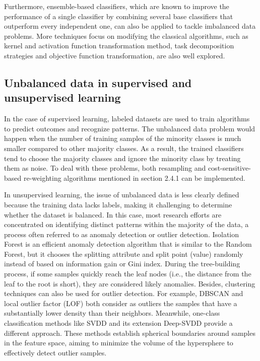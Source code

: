 Furthermore, ensemble-based classifiers, which are known to improve the performance of a single classifier by combining several base classifiers that outperform every independent one\cite{lane2012developing, krawczyk2013improved}, can also be applied to tackle imbalanced data problems. More techniques focus on modifying the classical algorithms, such as kernel and activation function transformation method\cite{raj2016towards, wu2016mixed}, task decomposition strategies\cite{xiao2016imbalanced} and objective function transformation, are also well explored. 

\subsection{Unbalanced data in supervised and unsupervised learning}
\label{subsec-lr-unbalance-super-unsuper}
In the case of supervised learning, labeled datasets are used to train algorithms to predict outcomes and recognize patterns. The unbalanced data problem would happen when the number of training samples of the minority classes is much smaller compared to other majority classes. As a result, the trained classifiers tend to choose the majority classes and ignore the minority class by treating them as noise\cite{lu1998robust, articleM}. To deal with these problems, both resampling and cost-sensitive-based re-weighting algorithms mentioned in section 2.4.1 can be implemented. 

In unsupervised learning, the issue of unbalanced data is less clearly defined because the training data lacks labels, making it challenging to determine whether the dataset is balanced. In this case, most research efforts are concentrated on identifying distinct patterns within the majority of the data, a process often referred to as anomaly detection or outlier detection\cite{chandola2009anomaly}. Isolation Forest is an efficient anomaly detection algorithm that is similar to the Random Forest, but it chooses the splitting attribute and split point (value) randomly instead of based on information gain or Gini index. During the tree-building process, if some samples quickly reach the leaf nodes (i.e., the distance from the leaf to the root is short), they are considered likely anomalies\cite{liu2008isolation}. Besides, clustering techniques can also be used for outlier detection. For example, DBSCAN\cite{ester1996density} and local outlier factor (LOF)\cite{breunig2000lof} both consider as outliers the samples that have a substantially lower density than their neighbors. Meanwhile, one-class classification methods like SVDD \cite{tax1999support} and its extension Deep-SVDD \cite{pmlr-v80-ruff18a} provide a different approach. These methods establish spherical boundaries around samples in the feature space, aiming to minimize the volume of the hypersphere to effectively detect outlier samples. 

